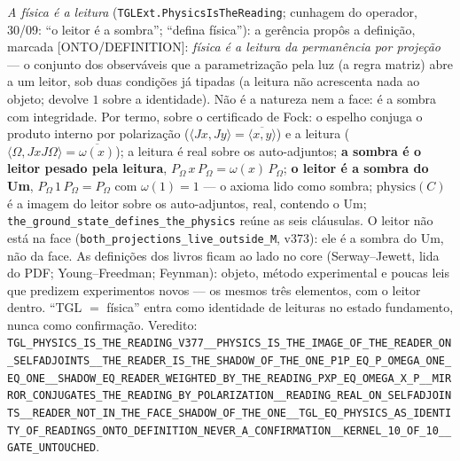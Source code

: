 \documentclass[11pt]{article}
\theoremstyle{definition}\newtheorem{deriv}{Derivação}
\begin{document}
\emph{A física é a leitura} (\texttt{TGLExt.PhysicsIsTheReading}; cunhagem do operador, 30/09: ``o leitor é a sombra''; ``defina física''): a gerência propôs a definição, marcada \textsf{[ONTO/DEFINITION]}: \emph{física é a leitura da permanência por projeção} --- o conjunto dos observáveis que a parametrização pela luz (a regra matriz) abre a um leitor, sob duas condições já tipadas (a leitura não acrescenta nada ao objeto; devolve $1$ sobre a identidade). Não é a natureza nem a face: é a sombra com integridade. Por termo, sobre o certificado de Fock: o espelho conjuga o produto interno por polarização ($\langle Jx,Jy\rangle=\overline{\langle x,y\rangle}$) e a leitura ($\langle\Omega,JxJ\Omega\rangle=\overline{\omega(x)}$); a leitura é real sobre os auto-adjuntos; \textbf{a sombra é o leitor pesado pela leitura}, $P_\Omega\,x\,P_\Omega=\omega(x)\,P_\Omega$; \textbf{o leitor é a sombra do Um}, $P_\Omega\,1\,P_\Omega=P_\Omega$ com $\omega(1)=1$ --- o axioma lido como sombra; $\mathrm{physics}(C)$ é a imagem do leitor sobre os auto-adjuntos, real, contendo o Um; \texttt{the\_ground\_state\_defines\_the\_physics} reúne as seis cláusulas. O leitor não está na face (\texttt{both\_projections\_live\_outside\_M}, v373): ele é a sombra do Um, não da face. As definições dos livros ficam ao lado no core (Serway--Jewett, lida do PDF; Young--Freedman; Feynman): objeto, método experimental e poucas leis que predizem experimentos novos --- os mesmos três elementos, com o leitor dentro. ``TGL $=$ física'' entra como identidade de leituras no estado fundamento, nunca como confirmação. Veredito: \texttt{TGL\_PHYSICS\_IS\_THE\_READING\_V377\_\_PHYSICS\_IS\_THE\_IMAGE\_OF\_THE\_READER\_ON\_SELFADJOINTS\_\_THE\_READER\_IS\_THE\_SHADOW\_OF\_THE\_ONE\_P1P\_EQ\_P\_OMEGA\_ONE\_EQ\_ONE\_\_SHADOW\_EQ\_READER\_WEIGHTED\_BY\_THE\_READING\_PXP\_EQ\_OMEGA\_X\_P\_\_MIRROR\_CONJUGATES\_THE\_READING\_BY\_POLARIZATION\_\_READING\_REAL\_ON\_SELFADJOINTS\_\_READER\_NOT\_IN\_THE\_FACE\_SHADOW\_OF\_THE\_ONE\_\_TGL\_EQ\_PHYSICS\_AS\_IDENTITY\_OF\_READINGS\_ONTO\_DEFINITION\_NEVER\_A\_CONFIRMATION\_\_KERNEL\_10\_OF\_10\_\_GATE\_UNTOUCHED}.
\end{document}

